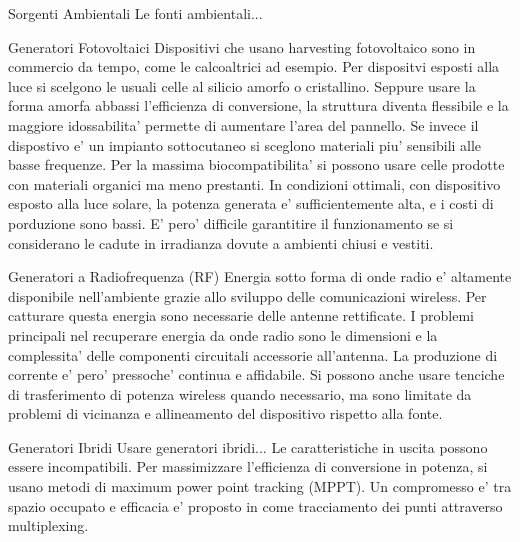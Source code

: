 \begin{multicols}{2}
\begin{section}{Sorgenti Ambientali}
    Le fonti ambientali...
    \begin{subsection}{Generatori Fotovoltaici}
    Dispositivi che usano harvesting fotovoltaico sono in commercio da tempo, come le calcoaltrici ad esempio. Per dispositvi esposti alla luce si scelgono le usuali celle al silicio amorfo o cristallino. Seppure usare la forma amorfa abbassi l'efficienza di conversione, la struttura diventa flessibile e la maggiore idossabilita' permette di aumentare l'area del pannello. Se invece il dispostivo e' un impianto sottocutaneo si sceglono materiali piu' sensibili alle basse frequenze. Per la massima biocompatibilita' si possono usare celle prodotte con materiali organici ma meno prestanti. In condizioni ottimali, con dispositivo esposto alla luce solare, la potenza generata e' sufficientemente alta, e i costi di porduzione sono bassi. E' pero' difficile garantitire il funzionamento se si considerano le cadute in irradianza dovute a ambienti chiusi e vestiti.
    \end{subsection}

    \begin{subsection}{Generatori a Radiofrequenza (RF)}
    Energia sotto forma di onde radio e' altamente disponibile nell'ambiente grazie allo sviluppo delle comunicazioni wireless. Per catturare questa energia sono necessarie delle antenne rettificate. I problemi principali nel recuperare energia da onde radio sono le dimensioni e la complessita' delle componenti circuitali accessorie all'antenna. La produzione di corrente e' pero' pressoche' continua e affidabile. Si possono anche usare tenciche di trasferimento di potenza wireless quando necessario, ma sono limitate da problemi di vicinanza e allineamento del dispositivo rispetto alla fonte. 
    \end{subsection}
\end{section}

\begin{section}{Generatori Ibridi}
    Usare generatori ibridi... 
    Le caratteristiche in uscita possono essere incompatibili.\cite{shaukatApplicationsSustainableHybrid2023} 
    Per massimizzare l'efficienza di conversione in potenza, si usano metodi di maximum power point tracking (MPPT). Un compromesso e' tra spazio occupato e efficacia e' proposto in \cite{liuMPPTMultiplexedHybrid2023} come tracciamento dei punti attraverso multiplexing.
\end{section}

\end{multicols}